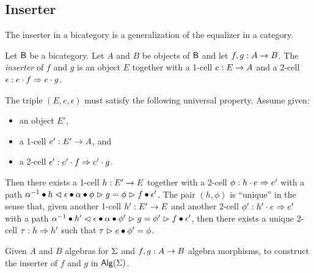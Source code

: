 \subsection{Inserter}

The inserter in a bicategory is a generalization of the equalizer in
a category.

\begin{definition}\label{def:inserter}
Let $\B$ be a bicategory. Let $A$ and $B$ be objects of $\B$ and let
$f,g : A \onecell B$. The \emph{inserter} of $f$ and $g$ is an
object $E$ together with a 1-cell $e : E \onecell A$ and a 2-cell
$\epsilon : e \cdot f\twocell e \cdot g$.

The triple $(E,e,\epsilon)$ must satisfy the following universal
property. Assume given:
\begin{itemize}
\item an object $E'$,
\item a 1-cell $e' : E' \onecell A$, and
\item a 2-cell $\epsilon' : e' \cdot f \twocell e' \cdot g$.
\end{itemize}
Then there exists a 1-cell $h : E' \onecell E$ together with a 2-cell
$\phi : h \cdot e \twocell e'$ with a path $\rassoc{h}{e}{f} \vcomp
h \whiskerl \epsilon \vcomp \lassoc{h}{e}{g} \vcomp \phi \whiskerr g
= \phi \whiskerr f \vcomp \epsilon'$.
The pair $(h,\phi)$ is ``unique'' in the sense that,
given another 1-cell $h' : E' \onecell E$ and another 2-cell $\phi' :
h' \cdot e \twocell e'$ with a path $\rassoc{h'}{e}{f} \vcomp
h' \whiskerl \epsilon \vcomp \lassoc{h'}{e}{g} \vcomp \phi' \whiskerr g
= \phi' \whiskerr f \vcomp \epsilon'$, then there exists a unique 2-cell $\tau : h
\twocell h'$ such that $\tau \whiskerr e \vcomp \phi' = \phi$.
\end{definition}

\begin{problem}
\label{prob:inserter}
Given $A$ and $B$ algebras for $\sign$ and $f,g : A \onecell B$
algebra morphisms, to construct the inserter of $f$ and $g$ in $\alg(\sign)$.
\end{problem}


